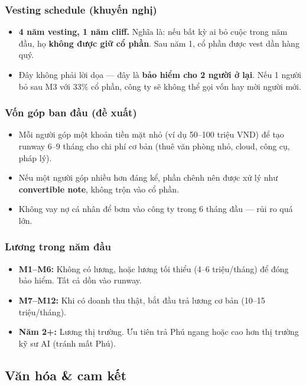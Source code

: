 \documentclass[11pt,a4paper]{article}
\begin{document}
\subsubsection*{Vesting schedule (khuyến nghị)}

\begin{itemize}
\item \textbf{4 năm vesting, 1 năm cliff.} Nghĩa là: nếu bất kỳ ai bỏ cuộc trong
năm đầu, họ \textbf{không được giữ cổ phần}. Sau năm 1, cổ phần được vest dần
hàng quý.
\item Đây không phải lời dọa --- đây là \textbf{bảo hiểm cho 2 người ở lại}. Nếu
1 người bỏ sau M3 với 33\% cổ phần, công ty sẽ không thể gọi vốn hay mời
người mới.
\end{itemize}

\subsubsection*{Vốn góp ban đầu (đề xuất)}

\begin{itemize}
\item Mỗi người góp một khoản tiền mặt nhỏ (ví dụ 50--100 triệu VND) để tạo runway
6--9 tháng cho chi phí cơ bản (thuê văn phòng nhỏ, cloud, công cụ, pháp lý).
\item Nếu một người góp nhiều hơn đáng kể, phần chênh nên được xử lý như
\textbf{convertible note}, không trộn vào cổ phần.
\item Không vay nợ cá nhân để bơm vào công ty trong 6 tháng đầu --- rủi ro quá lớn.
\end{itemize}

\subsubsection*{Lương trong năm đầu}

\begin{itemize}
\item \textbf{M1--M6:} Không có lương, hoặc lương tối thiểu (4--6 triệu/tháng) để
đóng bảo hiểm. Tất cả dồn vào runway.
\item \textbf{M7--M12:} Khi có doanh thu thật, bắt đầu trả lương cơ bản
(10--15 triệu/tháng).
\item \textbf{Năm 2+:} Lương thị trường. Ưu tiên trả Phú ngang hoặc cao hơn
thị trường kỹ sư AI (tránh mất Phú).
\end{itemize}

\subsection{Văn hóa \& cam kết}
\end{document}
